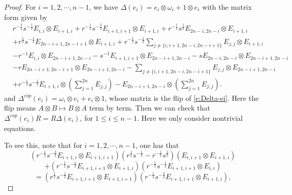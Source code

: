 \documentclass[10pt,a4paper]{amsart}
\begin{document}
\begin{proof}
	For $i=1,2, \cdots ,n-1$, we have $\Delta\left(e_i\right)=e_i \otimes \omega_i+1 \otimes e_i$ with the matrix form given by
\begin{equation}\label{e:Delta-ei}
\begin{aligned}
	&r^{-\frac{3}{2}} s^{-\frac{1}{2}} E_{i, i} \otimes E_{i+1, i}+r^{-\frac{1}{2}} s^{-\frac{3}{2}} E_{i+1, i+1} \otimes E_{i+1, i}+r^{-\frac{1}{2}} s^{\frac{1}{2}} E_{2 n-i, 2 n-i} \otimes E_{i+1, i}\\
	&+r^{\frac{1}{2}} s^{-\frac{1}{2}} E_{2 n-i+1,2 n-i+1} \otimes E_{i+1, i}+r^{-\frac{1}{2}} s^{-\frac{1}{2}} \sum_{j \neq\{i, i+1,2 n-i, 2 n-i+1\}} E_{j, j} \otimes E_{i+1, i}\\
	&-r^{-1} E_{i, i} \otimes E_{2 n-i+1,2 n-i}-s^{-1} E_{i+1, i+1} \otimes E_{2 n-i+1,2 n-i}-s E_{2 n-i, 2 n-i} \otimes E_{2 n-i+1,2 n-i}\\
	&-r E_{2 n-i+1,2 n-i+1} \otimes E_{2 n-i+1,2 n-i}-\sum_{j \neq\{i, i+1,2 n-i, 2 n-i+1\}} E_{j, j} \otimes E_{2 n-i+1,2 n-i}\\
	&+r^{-\frac{1}{2}} s^{-\frac{1}{2}} E_{i+1, i} \otimes\left(\sum_{j=1}^{2 n} E_{j, j}\right)-E_{2 n-i+1,2 n-i} \otimes\left(\sum_{j=1}^{2 n} E_{j, j}\right).
\end{aligned}
\end{equation}	
and $\Delta^{c o p}\left(e_i\right)=\omega_i \otimes e_i+e_i \otimes 1$, whose matrix is the flip of \eqref{e:Delta-ei}.
Here the flip means $A\otimes B\mapsto B\otimes A$ term by term.
Then we can check that
$\Delta^{c o p}\left(e_i\right) R=R \Delta\left(e_i\right)$, for $1\leq i\leq n-1$. Here we only consider nontrivial equations.

To see this, note that for $i=1,2, \cdots ,n-1$, one has that
$$
\left(r^{-\frac{1}{2}} s^{-\frac{3}{2}} E_{i+1, i} \otimes E_{i+1, i+1}\right)\left(r^{\frac{1}{2}} s^{-\frac{1}{2}}-r^{-\frac{1}{2}} s^{\frac{1}{2}}\right)\left(E_{i, i+1} \otimes E_{i+1, i}\right)
$$
$$
+\left(r^{-\frac{1}{2}} s^{-\frac{1}{2}} E_{i+1, i+1} \otimes E_{i+1, i}\right)\left(r^{-\frac{1}{2}} s^{-\frac{1}{2}} E_{i+1, i+1} \otimes E_{i, i}\right)
$$
$$
=\left(r^{\frac{1}{2}} s^{-\frac{1}{2}} E_{i+1, i+1} \otimes E_{i+1, i+1}\right)\left(r^{-\frac{1}{2}} s^{-\frac{3}{2}} E_{i+1, i+1} \otimes E_{i+1, i}\right),
$$


\end{proof}
\end{document}
